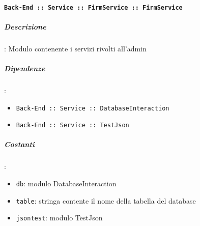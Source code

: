 \documentclass[../DefinizioneDiProdotto_v3.0.0.tex]{subfiles}
\begin{document}
\paragraph{\texttt{Back-End :: Service :: FirmService :: FirmService}}
\subparagraph{Descrizione}: Modulo contenente i servizi rivolti all'admin
\subparagraph{Dipendenze}:
\begin{itemize}
	\item \texttt{Back-End :: Service :: DatabaseInteraction}
	\item \texttt{Back-End :: Service :: TestJson}
\end{itemize}
\subparagraph{Costanti}:
\begin{itemize}
	\item \texttt{db}: modulo DatabaseInteraction
	\item \texttt{table}: stringa contente il nome della tabella del database
	\item \texttt{jsontest}: modulo TestJson
\end{itemize}
\end{document}
